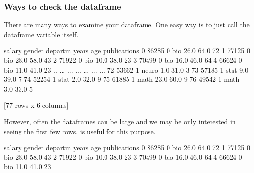 \documentclass[letterpaper,10pt,english]{sphinxmanual}
\begin{document}
\subsubsection{Ways to check the dataframe}
\label{\detokenize{content/Introduction_to_Pandas:ways-to-check-the-dataframe}}
There are many ways to examine your dataframe. One easy way is to just call the dataframe variable itself.

\begin{sphinxVerbatim}[commandchars=\\\{\}]
\end{sphinxVerbatim}

\begin{sphinxVerbatim}[commandchars=\\\{\}]
    salary  gender departm  years   age  publications
0    86285       0     bio   26.0  64.0            72
1    77125       0     bio   28.0  58.0            43
2    71922       0     bio   10.0  38.0            23
3    70499       0     bio   16.0  46.0            64
4    66624       0     bio   11.0  41.0            23
..     ...     ...     ...    ...   ...           ...
72   53662       1   neuro    1.0  31.0             3
73   57185       1    stat    9.0  39.0             7
74   52254       1    stat    2.0  32.0             9
75   61885       1    math   23.0  60.0             9
76   49542       1    math    3.0  33.0             5

[77 rows x 6 columns]
\end{sphinxVerbatim}

However, often the dataframes can be large and we may be only interested in seeing the first few rows.   is useful for this purpose.

\begin{sphinxVerbatim}[commandchars=\\\{\}]
\end{sphinxVerbatim}

\begin{sphinxVerbatim}[commandchars=\\\{\}]
   salary  gender departm  years   age  publications
0   86285       0     bio   26.0  64.0            72
1   77125       0     bio   28.0  58.0            43
2   71922       0     bio   10.0  38.0            23
3   70499       0     bio   16.0  46.0            64
4   66624       0     bio   11.0  41.0            23
\end{sphinxVerbatim}
\end{document}
